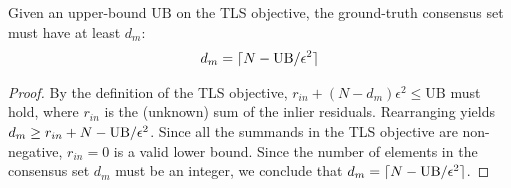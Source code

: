 \begin{lemma}
	Given an upper-bound $\text{UB}$ on the TLS objective, the ground-truth consensus set must have at least $d_{m}$:
    \begin{equation}
        \begin{aligned}
            d_m = \lceil N - \text{UB} / \epsilon^2 \rceil
        \end{aligned}
    \end{equation}
\end{lemma}

\begin{proof}
    By the definition of the TLS objective, 
    $r_{in} + (N - d_m) \epsilon^2 \leq \text{UB}$ must hold, where $r_{in}$ is the (unknown) sum of the inlier residuals. Rearranging yields $d_m \geq r_{in}  + N - \text{UB} / \epsilon^2$.
    Since all the summands in the TLS objective are non-negative, $r_{in} = 0$ is a valid lower bound. Since the number of elements in the consensus set $d_m$ must be an integer, we conclude that $d_m = \lceil N - \text{UB} / \epsilon^2 \rceil$.
\end{proof}



